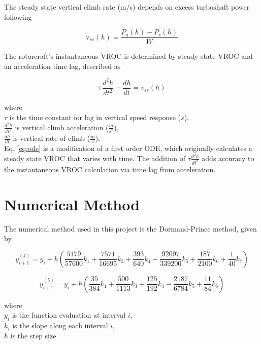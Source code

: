 \documentclass[12pt]{report}
\begin{document}
\noindent The steady state vertical climb rate (m/s) depends on excess turboshaft power following

\begin{equation} \label{eq:roc}
    \mathrm v_{ss}(h)=\frac{P_a(h)-P_r(h)}{W}
\end{equation}

The rotorcraft's instantaneous VROC is determined by steady-state VROC and an acceleration time lag,
described as

\begin{equation} \label{eq:ode}
    \mathrm \tau\frac{d^{2}h}{dt^{2}}+\frac{dh}{dt}=v_{ss}(h)
\end{equation}

\noindent where\\
    \indent $\tau$ is the time constant for lag in vertical speed response ($s$),\\
    \indent $\frac{d^2h}{dt^2}$ is vertical climb acceleration ($\frac{m}{s^2}$),\\
    \indent $\frac{dh}{dt}$ is vertical rate of climb ($\frac{m}{s}$).\\

Eq. \ref{eq:ode} is a modification of a first order ODE, which originally calculates a steady state VROC that
varies with time. The addition of $\tau\frac{d^2h}{dt^2}$ adds accuracy to the instantaneous VROC calculation
via time lag from acceleration.

\section{Numerical Method}

The numerical method used in this project is the Dormand-Prince method, given by

\begin{equation} \label{eq:RK4}
y_{i+1}^{(4)} = y_i + h\left(
    \frac{5179}{57600}k_1
  + \frac{7571}{16695}k_3
  + \frac{393}{640}k_4
  - \frac{92097}{339200}k_5
  + \frac{187}{2100}k_6
  + \frac{1}{40}k_7
\right)
\end{equation}

\begin{equation} \label{eq:RK5}
y_{i+1}^{(5)} = y_i + h\left(
    \frac{35}{384}k_1
  + \frac{500}{1113}k_3
  + \frac{125}{192}k_4
  - \frac{2187}{6784}k_5
  + \frac{11}{84}k_6
\right)
\end{equation}

\noindent where\\
\indent $y_i$ is the function evaluation at interval $i$,\\
\indent $k_i$ is the slope along each interval $i$,\\
\indent $h$ is the step size\\
\end{document}
